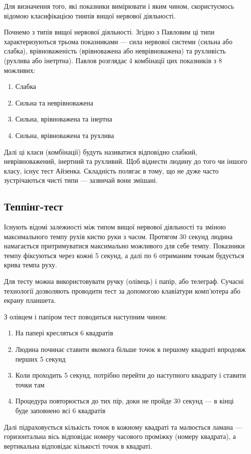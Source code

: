 Для визначення того, які показники вимірювати і яким чином,
скористуємось відомою класифікацією тиипів вищої нервової діяльності.

Почнемо з типів вищої нервової діяльності.
Згідно з Павловим \cite{Pavlov:1923} ці типи характеризуються трьома показниками
--- сила нервової системи (сильна або слабка), врівноваженість (врівноважена або
неврівноважена) та рухливість (рухлива або інетртна).
Павлов розглядає 4 комбінації цих показників з 8 можливих:
\begin{enumerate}
  \item Слабка
  \item Сильна та неврівноважена
  \item Сильна, врівноважена та інертна
  \item Сильна, врівноважена та рухлива
\end{enumerate}
Далі ці класи (комбінації) будуть називатися відповідно слабкий,
неврівноважений, інертний та рухливий.
Щоб віднести людину до того чи іншого класу, існує тест Айзенка.
Складність полягає в тому, що не дуже часто зустрічаються чисті типи ---
зазвичай вони змішані.

\subsection{Теппінг-тест}

Існують відомі залежності між типом вищої нервової діяльності та зміною
максимального темпу рухів кистю руки з часом.
Протягом 30 секунд людина намагається притримуватися максимально можливого для
себе темпу.
Показники темпу фіксуються через кожні 5 секунд, а далі по 6 отриманим точкам
будується крива темпа руху. \cite{Ilin:2001}

Для тесту можна використовувати ручку (олівець) і папір, або телеграф.
Сучасні технології дозволяють проводити тест за допомогою клавіатури комп’ютера
або екрану планшета.

З олівцем і папіром тест поводиться наступним чином:
\begin{enumerate}
  \item На папері кресляться 6 квадратів
  \item Людина починає ставити якомога більше точок в першому квадраті впродовж
    перших 5 секунд
  \item Коли проходить 5 секунд, потрібно перейти до наступного квадрату і
    ставити точки там
  \item Процедура повторюється до тих пір, доки не пройде 30 секунд --- в кінці
    буде заповнено всі 6 квадратів
\end{enumerate}
Далі підраховується кількість точок в кожному квадраті та малюється ламана ---
горизонтальна вісь відповідає номеру часового проміжку (номеру квадрата), а
вертикальна відповідає кількості точок в квадраті.

